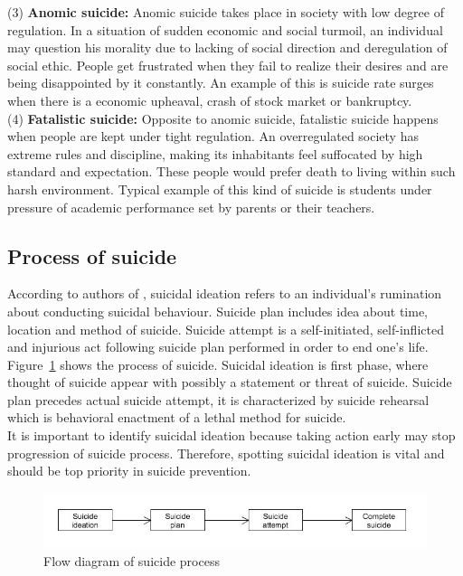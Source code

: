 (3) \textbf{Anomic suicide:} Anomic suicide takes place in society with low degree of regulation. In a situation of sudden economic and social turmoil, an individual may question his morality due to lacking of social direction and deregulation of social ethic. People get frustrated when they fail to realize their desires and are being disappointed by it constantly. An example of this is suicide rate surges when there is a economic upheaval, crash of stock market or bankruptcy.\\
(4) \textbf{Fatalistic suicide:} Opposite to anomic suicide, fatalistic suicide happens when people are kept under tight regulation. An overregulated society has extreme rules and discipline, making its inhabitants feel suffocated by high standard and expectation. These people would prefer death to living within such harsh environment. Typical example of this kind of suicide is students under pressure of academic performance set by parents or their teachers.\\

\subsection*{Process of suicide}
According to authors of \cite{O'Carroll1996}, suicidal ideation refers to an individual's rumination about conducting suicidal behaviour. Suicide plan includes idea about time, location and method of suicide. Suicide attempt is a self-initiated, self-inflicted and injurious act following suicide plan performed in order to end one's life.\\
Figure~\ref{fig:suicide_process} shows the process of suicide. Suicidal ideation is first phase, where thought of suicide appear with possibly a statement or threat of suicide. Suicide plan precedes actual suicide attempt, it is characterized by suicide rehearsal which is behavioral enactment of a lethal method for suicide.\\
It is important to identify suicidal ideation because taking action early may stop progression of suicide process. Therefore, spotting suicidal ideation is vital and should be top priority in suicide prevention.
 
\begin{figure}[!ht]
\centering
\includegraphics[width=\textwidth, clip=true]{img/suicide_process}
\caption[Process of suicide]{Flow diagram of suicide process} 
\label{fig:suicide_process}
\end{figure}

